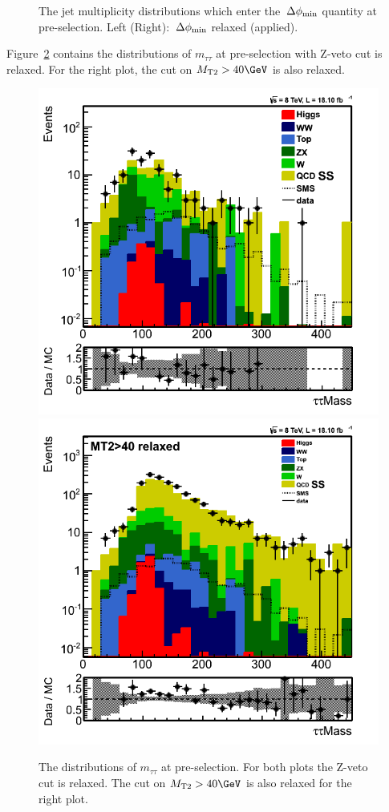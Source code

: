 \begin{figure}[!Hhtb]
\caption{The jet multiplicity distributions which enter the $\,{\Delta\phi_{\rm min}}$ quantity at pre-selection. Left (Right): $\,{\Delta\phi_{\rm min}}$ relaxed (applied).}
\label{fig:njetsformindphi}
\end{figure}

Figure~\ref{fig:ditaumass} contains the distributions of $m_{\tau\tau}$ at pre-selection with Z-veto cut is relaxed. For the right plot, the cut on $\mttwo>40\GeV$ is also relaxed.
\begin{figure}[!Hhtb]
\centering
\includegraphics[angle=0,scale=0.35]{TauTauFigs/Invmass.png}
\includegraphics[angle=0,scale=0.35]{TauTauFigs/InvmassMT2relaxed.png} \\
\caption{The distributions of $m_{\tau\tau}$ at pre-selection. For both plots the Z-veto cut is relaxed. The cut on $\mttwo>40\GeV$ is also relaxed for the right plot.}
\label{fig:ditaumass}
\end{figure}


